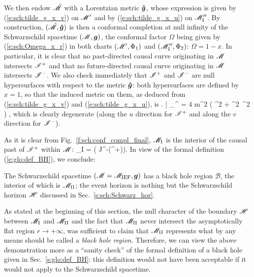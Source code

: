We then endow $\tilde{\mathscr{M}}$ with a Lorentzian metric $\bm{\tilde{g}}$, whose
expression is given by (\ref{e:sch:tilde_g_x_v}) on $\mathscr{M}'$ and
by (\ref{e:sch:tilde_g_x_u}) on $\mathscr{M}''_{\rm I}$.
By construction, $(\tilde{\mathscr{M}},\bm{\tilde{g}})$ is then a conformal completion at null
infinity of the Schwarzschild spacetime $(\mathscr{M},\bm{g})$, the conformal factor
$\Omega$ being given by (\ref{e:sch:Omega_x_r}) in both
charts $(\mathscr{M}',\Phi_1)$ and $(\mathscr{M}''_{\rm I},\Phi_2)$: $\Omega = 1 -x$.
In particular, it is clear that no past-directed causal curve originating in
$\mathscr{M}$ intersects $\mathscr{I}^+$ and that no future-directed causal curve originating in
$\mathscr{M}$ intersects $\mathscr{I}^-$. We also check immediately that $\mathscr{I}^+$ and $\mathscr{I}^-$
are null hypersurfaces with respect to the metric $\bm{\tilde{g}}$:
both hypersurfaces are defined by $x=1$, so that the induced metric on them,
as
deduced from (\ref{e:sch:tilde_g_x_v}) and
(\ref{e:sch:tilde_g_x_u}), is
\be
    \left.  \right| _{\scri^\pm} = 4 m^2 \left(
        \dd \th^2  + \sin^2\th \, \dd \ph^2 \right) ,
\ee
which is clearly degenerate (along the $u$ direction for $\mathscr{I}^+$
and along the $v$ direction for $\mathscr{I}^-$).

As it is clear from Fig.~\ref{f:sch:conf_compl_final}, $\mathscr{M}_{\rm I}$
is the interior of the causal past of $\mathscr{I}^+$ within $\mathscr{M}$:
\be
    \M_{\rm I} = \left( J^-(\scri^+)\cap\M \right).
\ee
In view of the formal definition (\ref{e:glo:def_BH}), we conclude:
\begin{prop}
The Schwarzschild spacetime $(\mathscr{M}=\mathscr{M}_{\rm IEF}, \bm{g})$
has a black hole region $\mathscr{B}$, the interior
of which is $\mathscr{M}_{\rm II}$; the event horizon is nothing but the
Schwarzschild horizon $\mathscr{H}$ discussed in Sec.~\ref{s:sch:Schwarz_hor}.
\end{prop}

\begin{remark}
As stated at the beginning of this section, the null character of the boundary
$\mathscr{H}$ between $\mathscr{M}_{\rm I}$ and $\mathscr{M}_{\rm II}$ and the fact that
$\mathscr{M}_{\rm II}$ never intersect the asymptotically flat region $r\rightarrow +\infty$,
was sufficient to claim that $\mathscr{M}_{\rm II}$ represents what by any means should be
called a \emph{black hole region}.
Therefore, we can view the above demonstration more as a ``sanity check''
of the formal definition of a black hole given in Sec.~\ref{s:glo:def_BH}:
this definition would not have been acceptable if it would not
apply to the Schwarzschild spacetime.
\end{remark}

